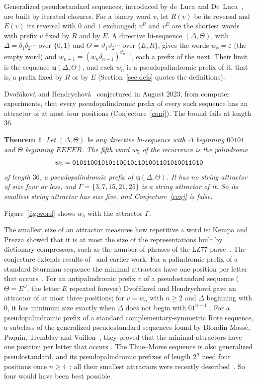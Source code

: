 \documentclass[11pt]{article}
\newtheorem{theorem}{Theorem}
\theoremstyle{remark}
\newcommand{\w}[1]{\textup{\texttt{#1}}}
\begin{document}
Generalized pseudostandard sequences, introduced by de~Luca and
De~Luca~\cite{dldl}, are built by iterated closures. For a binary word $v$,
let $R(v)$ be its reversal and $E(v)$ its reversal with $0$ and $1$
exchanged; $v^R$ and $v^E$ are the shortest words with prefix $v$ fixed by
$R$ and by $E$. A directive bi-sequence $(\Delta,\Theta)$, with
$\Delta=\delta_1\delta_2\cdots$ over $\{0,1\}$ and
$\Theta=\vartheta_1\vartheta_2\cdots$ over $\{E,R\}$, gives the words
$w_0=\varepsilon$ (the empty word) and $w_{n+1}=(w_n\delta_{n+1})^{\vartheta_{n+1}}$, each a
prefix of the next. Their limit is the sequence $\mathbf u(\Delta,\Theta)$,
and each $w_n$ is a pseudopalindromic prefix of it, that is, a prefix fixed by
$R$ or by $E$ (Section~\ref{sec:defs} quotes the definitions).

Dvořáková and Hendrychová~\cite{dh} conjectured in August 2023, from computer
experiments, that every pseudopalindromic prefix of every such sequence has an
attractor of at most four positions (Conjecture~\ref{conj}). The bound fails
at length $36$.

\begin{theorem}\label{thm:main}
Let $(\Delta,\Theta)$ be any directive bi-sequence with $\Delta$ beginning
$00101$ and $\Theta$ beginning $EEEER$. The fifth word $w_5$ of the
recurrence is the palindrome
\[
w_5=\w{010110010101100101101001101010011010}
\]
of length $36$, a pseudopalindromic prefix of $\mathbf u(\Delta,\Theta)$. It
has no string attractor of size four or less, and
$\Gamma=\{3,7,15,21,25\}$ is a string attractor of it. So its smallest string
attractor has size five, and Conjecture~\ref{conj} is false.
\end{theorem}

Figure~\ref{fig:word} shows $w_5$ with the attractor $\Gamma$.

The smallest size of an attractor measures how repetitive a word is: Kempa
and Prezza showed that it is at most the size of the representations built
by dictionary compressors, such as the number of phrases of the LZ77
parse~\cite{kp}. The conjecture extends results of~\cite{dh} and earlier
work. For a palindromic prefix of a standard Sturmian sequence the minimal
attractors have one position per letter that occurs~\cite{d-epi}. For an
antipalindromic prefix $v$ of a pseudostandard sequence ($\Theta=E^\omega$,
the letter $E$ repeated forever)
Dvořáková and Hendrychová gave an attractor of at most three positions; for
$v=w_n$ with $n\geq2$ and $\Delta$ beginning with $0$, it has minimum size
exactly when $\Delta$ does not begin with $01^{n-1}$ \cite[Theorem~8]{dh}.
For a pseudopalindromic prefix of a standard complementary-symmetric Rote
sequence, a subclass of the generalized pseudostandard sequences found by
Blondin Massé, Paquin, Tremblay and Vuillon~\cite{bptv}, they proved that the minimal attractors
have one position per letter that occurs \cite[Theorem~19]{dh}. The
Thue--Morse sequence is also generalized pseudostandard, and its
pseudopalindromic prefixes of length $2^n$ need four positions once
$n\geq4$~\cite{kutsukake}; all their smallest attractors were recently
described~\cite{banbara,faro}. So four would have been best possible.
\end{document}

